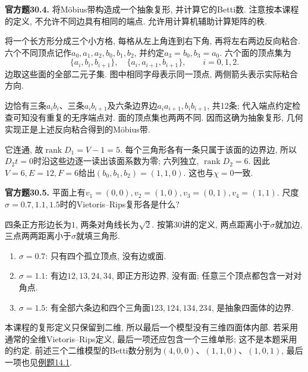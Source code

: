 \begin{exercise}\label{cq:30.4}
\textbf{官方题30.4.} 将M\"obius带构造成一个抽象复形, 并计算它的Betti数. 注意按本课程的定义, 不允许不同边具有相同的端点. 允许用计算机辅助计算矩阵的秩.
\end{exercise}
\begin{solution}
将一个长方形分成三个小方格, 每格从左上角连到右下角, 再将左右两边反向粘合. 六个不同顶点记作$a_0,a_1,a_2,b_0,b_1,b_2$, 并约定$a_3=b_0,b_3=a_0$. 六个面的顶点集为
\[
\{a_i,b_i,b_{i+1}\},\quad \{a_i,a_{i+1},b_{i+1}\},\qquad i=0,1,2.
\]
边取这些面的全部二元子集. 图中相同字母表示同一顶点, 两侧箭头表示实际粘合方向.
\begin{center}
\end{center}
边恰有三条$a_ib_i$、三条$a_ib_{i+1}$及六条边界边$a_ia_{i+1},b_ib_{i+1}$, 共12条; 代入端点约定检查可知没有重复的无序端点对. 面的顶点集也两两不同. 因而这确为抽象复形, 几何实现正是上述反向粘合得到的M\"obius带.

它连通, 故$\operatorname{rank}D_1=V-1=5$. 每个三角形各有一条只属于该面的边界边, 所以$D_2t=0$时沿这些边逐一读出该面系数为零; 六列独立, $\operatorname{rank}D_2=6$. 因此$V=6,E=12,F=6$给出$(b_0,b_1,b_2)=(1,1,0)$. 这也与$\chi=0$一致.
\end{solution}

\begin{exercise}\label{cq:30.5}
\textbf{官方题30.5.} 平面上有$v_1=(0,0),v_2=(1,0),v_3=(0,1),v_4=(1,1)$. 尺度$\sigma=0.7,1.1,1.5$时的Vietoris--Rips复形各是什么?
\end{exercise}
\begin{solution}
四条正方形边长为$1$, 两条对角线长为$\sqrt2$. 按第30讲的定义, 两点距离小于$\sigma$就加边, 三点两两距离小于$\sigma$就填三角形.
\begin{enumerate}[label=(\arabic*)]
\item $\sigma=0.7$: 只有四个孤立顶点, 没有边或面.
\item $\sigma=1.1$: 有边$12,13,24,34$, 即正方形边界, 没有面; 任意三个顶点都包含一对对角点.
\item $\sigma=1.5$: 有全部六条边和四个三角面$123,124,134,234$, 是抽象四面体的边界.
\end{enumerate}
本课程的复形定义只保留到二维, 所以最后一个模型没有三维四面体内部. 若采用通常的全维Vietoris--Rips定义, 最后一项还应包含一个三维单形; 这不是本题采用的约定. 前述三个二维模型的Betti数分别为$(4,0,0)$、$(1,1,0)$、$(1,0,1)$, 最后一项也见\hyperlink{example.14.1}{例题14.1}.
\end{solution}

